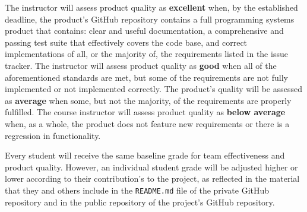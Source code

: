 \documentclass[11pt]{article}
\newcommand{\reflection}{\lstinline{README.md}}
\begin{document}
The instructor will assess product quality as {\bf excellent} when, by the established deadline, the product's GitHub
repository contains a full programming systems product that contains: clear and useful documentation, a comprehensive
and passing test suite that effectively covers the code base, and correct implementations of all, or the majority of,
the requirements listed in the issue tracker. The instructor will assess product quality as {\bf good} when all of the
aforementioned standards are met, but some of the requirements are not fully implemented or not implemented correctly.
The product's quality will be assessed as {\bf average} when some, but not the majority, of the requirements are
properly fulfilled. The course instructor will assess product quality as {\bf below average} when, as a whole, the
product does not feature new requirements or there is a regression in functionality.

Every student will receive the same baseline grade for team effectiveness and product quality. However, an individual
student grade will be adjusted higher or lower according to their contribution's to the project, as reflected in the
material that they and others include in the \reflection{} file of the private GitHub repository and in the public
repository of the project's GitHub repository.
\end{document}
